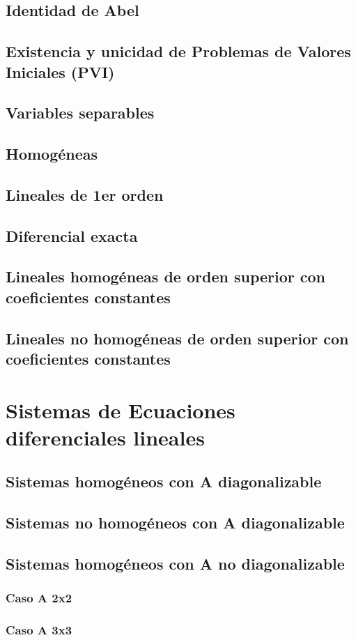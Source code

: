 \documentclass[oneside]{article}
\numberwithin{equation}{section}
\numberwithin{figure}{section}
\numberwithin{table}{section}
\begin{document}
				\subsection{Identidad de Abel}
				\subsection{Existencia y unicidad de Problemas de Valores Iniciales (PVI)}
				\subsection{Variables separables}
				\subsection{Homogéneas}
				\subsection{Lineales de 1er orden}
				\subsection{Diferencial exacta}
				\subsection{Lineales homogéneas de orden superior con coeficientes constantes}
				\subsection{Lineales no homogéneas de orden superior con coeficientes constantes}
			\section{Sistemas de Ecuaciones diferenciales lineales}
				\subsection{Sistemas homogéneos con A diagonalizable}
				\subsection{Sistemas no homogéneos con A diagonalizable}
				\subsection{Sistemas homogéneos con A no diagonalizable}
					\subsubsection{Caso A 2x2}
					\subsubsection{Caso A 3x3}
				
\pagebreak
\end{document}
